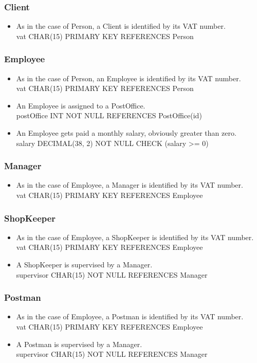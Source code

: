 \documentclass{report}[a4paper]
\theoremstyle{remark}
\begin{document}
\subsubsection{Client}
\begin{itemize}
    \item As in the case of Person, a Client is identified by its VAT number. \\ vat CHAR(15) PRIMARY KEY REFERENCES Person
\end{itemize}
\subsubsection{Employee}
\begin{itemize}
    \item As in the case of Person, an Employee is identified by its VAT number. \\ vat CHAR(15) PRIMARY KEY REFERENCES Person
    \item An Employee is assigned to a PostOffice. \\ postOffice INT NOT NULL REFERENCES PostOffice(id)
    \item An Employee gets paid a monthly salary, obviously greater than zero. \\ salary DECIMAL(38, 2) NOT NULL CHECK (salary >= 0)
\end{itemize}
\subsubsection{Manager}
\begin{itemize}
    \item As in the case of Employee, a Manager is identified by its VAT number. \\ vat CHAR(15) PRIMARY KEY REFERENCES Employee
\end{itemize}
\subsubsection{ShopKeeper}
\begin{itemize}
    \item As in the case of Employee, a ShopKeeper is identified by its VAT number. \\ vat CHAR(15) PRIMARY KEY REFERENCES Employee
    \item A ShopKeeper is supervised by a Manager. \\ supervisor CHAR(15) NOT NULL REFERENCES Manager
\end{itemize}
\subsubsection{Postman}
\begin{itemize}
    \item As in the case of Employee, a Postman is identified by its VAT number. \\ vat CHAR(15) PRIMARY KEY REFERENCES Employee
    \item A Postman is supervised by a Manager. \\ supervisor CHAR(15) NOT NULL REFERENCES Manager
\end{itemize}
\end{document}
